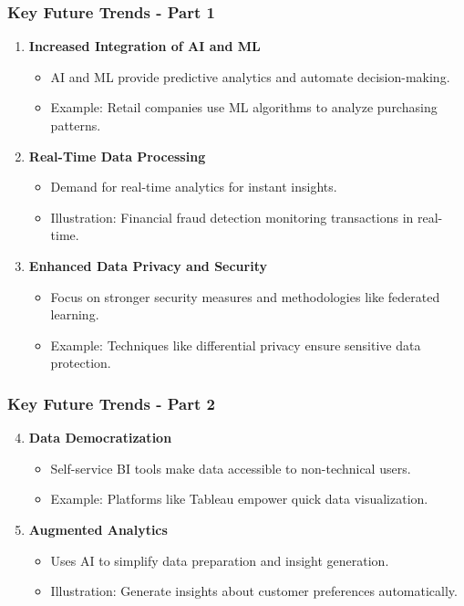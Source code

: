 \documentclass[aspectratio=169]{beamer}
\begin{document}
\begin{frame}[fragile]
    \frametitle{Key Future Trends - Part 1}
    \begin{enumerate}
        \item \textbf{Increased Integration of AI and ML}
        \begin{itemize}
            \item AI and ML provide predictive analytics and automate decision-making.
            \item Example: Retail companies use ML algorithms to analyze purchasing patterns.
        \end{itemize}

        \item \textbf{Real-Time Data Processing}
        \begin{itemize}
            \item Demand for real-time analytics for instant insights.
            \item Illustration: Financial fraud detection monitoring transactions in real-time.
        \end{itemize}

        \item \textbf{Enhanced Data Privacy and Security}
        \begin{itemize}
            \item Focus on stronger security measures and methodologies like federated learning.
            \item Example: Techniques like differential privacy ensure sensitive data protection.
        \end{itemize}
    \end{enumerate}
\end{frame}

\begin{frame}[fragile]
    \frametitle{Key Future Trends - Part 2}
    \begin{enumerate}
        \setcounter{enumi}{3}
        \item \textbf{Data Democratization}
        \begin{itemize}
            \item Self-service BI tools make data accessible to non-technical users.
            \item Example: Platforms like Tableau empower quick data visualization.
        \end{itemize}

        \item \textbf{Augmented Analytics}
        \begin{itemize}
            \item Uses AI to simplify data preparation and insight generation.
            \item Illustration: Generate insights about customer preferences automatically.
        \end{itemize}
    \end{enumerate}
\end{frame}
\end{document}
